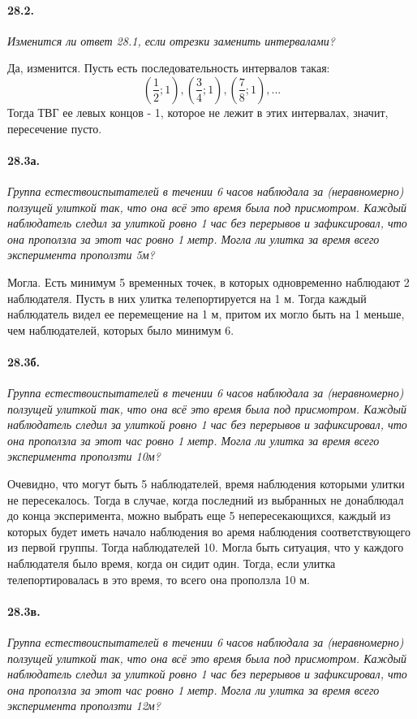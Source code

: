 \documentclass{book}
\begin{document}
\paragraph{28.2.}
\textit{Изменится ли ответ 28.1, если отрезки заменить интервалами?}

Да, изменится. Пусть есть последовательность интервалов такая:
\[(\frac{1}{2}; 1), (\frac{3}{4}; 1), (\frac{7}{8}; 1), ...\] Тогда ТВГ ее левых концов - 1, которое не лежит в этих интервалах, значит, пересечение пусто.

\paragraph{28.3а.}
\textit{Группа естествоиспытателей в течении 6 часов наблюдала за (неравномерно)
ползущей улиткой так, что она всё это время была под присмотром. Каждый наблюдатель
следил за улиткой ровно 1 час без перерывов и зафиксировал, что она проползла за этот
час ровно 1 метр. Могла ли улитка за время всего эксперимента проползти 5м?}

Могла. Есть минимум 5 временных точек, в которых одновременно наблюдают 2 наблюдателя. Пусть в них улитка телепортируется на 1 м. Тогда каждый наблюдатель видел ее перемещение на 1 м, притом их могло быть на 1 меньше, чем наблюдателей, которых было минимум 6.

\paragraph{28.3б.}
\textit{Группа естествоиспытателей в течении 6 часов наблюдала за (неравномерно)
ползущей улиткой так, что она всё это время была под присмотром. Каждый наблюдатель
следил за улиткой ровно 1 час без перерывов и зафиксировал, что она проползла за этот
час ровно 1 метр. Могла ли улитка за время всего эксперимента проползти 10м?}

Очевидно, что могут быть 5 наблюдателей, время наблюдения которыми улитки не пересекалось. Тогда в случае, когда последний из выбранных не донаблюдал до конца эксперимента, можно выбрать еще 5 непересекающихся, каждый из которых будет иметь начало наблюдения во аремя наблюдения соответствующего из первой группы. Тогда наблюдателей 10. Могла быть ситуация, что у каждого наблюдателя было время, когда он сидит один. Тогда, если улитка телепортировалась в это время, то всего она проползла 10 м.

\paragraph{28.3в.}
\textit{Группа естествоиспытателей в течении 6 часов наблюдала за (неравномерно)
ползущей улиткой так, что она всё это время была под присмотром. Каждый наблюдатель
следил за улиткой ровно 1 час без перерывов и зафиксировал, что она проползла за этот
час ровно 1 метр. Могла ли улитка за время всего эксперимента проползти 12м?}
\end{document}
